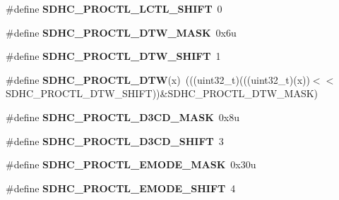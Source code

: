 \begin{DoxyCompactItemize}
\item 
\#define {\bfseries S\+D\+H\+C\+\_\+\+P\+R\+O\+C\+T\+L\+\_\+\+L\+C\+T\+L\+\_\+\+S\+H\+I\+FT}~0\hypertarget{group__SDHC__Register__Masks_ga754a95dd49bc69dbc62ae443f1c12d16}{}\label{group__SDHC__Register__Masks_ga754a95dd49bc69dbc62ae443f1c12d16}

\item 
\#define {\bfseries S\+D\+H\+C\+\_\+\+P\+R\+O\+C\+T\+L\+\_\+\+D\+T\+W\+\_\+\+M\+A\+SK}~0x6u\hypertarget{group__SDHC__Register__Masks_gabd8aa52532f5ddcfe86bbd56dd467aaa}{}\label{group__SDHC__Register__Masks_gabd8aa52532f5ddcfe86bbd56dd467aaa}

\item 
\#define {\bfseries S\+D\+H\+C\+\_\+\+P\+R\+O\+C\+T\+L\+\_\+\+D\+T\+W\+\_\+\+S\+H\+I\+FT}~1\hypertarget{group__SDHC__Register__Masks_ga7738f58de3f0c8a3c55fdf494fa9b7a5}{}\label{group__SDHC__Register__Masks_ga7738f58de3f0c8a3c55fdf494fa9b7a5}

\item 
\#define {\bfseries S\+D\+H\+C\+\_\+\+P\+R\+O\+C\+T\+L\+\_\+\+D\+TW}(x)~(((uint32\+\_\+t)(((uint32\+\_\+t)(x))$<$$<$S\+D\+H\+C\+\_\+\+P\+R\+O\+C\+T\+L\+\_\+\+D\+T\+W\+\_\+\+S\+H\+I\+FT))\&S\+D\+H\+C\+\_\+\+P\+R\+O\+C\+T\+L\+\_\+\+D\+T\+W\+\_\+\+M\+A\+SK)\hypertarget{group__SDHC__Register__Masks_gae2aac9ca891c75cdd5355a7cc7b012e8}{}\label{group__SDHC__Register__Masks_gae2aac9ca891c75cdd5355a7cc7b012e8}

\item 
\#define {\bfseries S\+D\+H\+C\+\_\+\+P\+R\+O\+C\+T\+L\+\_\+\+D3\+C\+D\+\_\+\+M\+A\+SK}~0x8u\hypertarget{group__SDHC__Register__Masks_ga597b9ab57f2ad515508d8b2e8b3832c7}{}\label{group__SDHC__Register__Masks_ga597b9ab57f2ad515508d8b2e8b3832c7}

\item 
\#define {\bfseries S\+D\+H\+C\+\_\+\+P\+R\+O\+C\+T\+L\+\_\+\+D3\+C\+D\+\_\+\+S\+H\+I\+FT}~3\hypertarget{group__SDHC__Register__Masks_ga9bd9fc5a38a643e4a04f03026a18e55a}{}\label{group__SDHC__Register__Masks_ga9bd9fc5a38a643e4a04f03026a18e55a}

\item 
\#define {\bfseries S\+D\+H\+C\+\_\+\+P\+R\+O\+C\+T\+L\+\_\+\+E\+M\+O\+D\+E\+\_\+\+M\+A\+SK}~0x30u\hypertarget{group__SDHC__Register__Masks_ga18ccde546ac8eb940360a8ff3671723b}{}\label{group__SDHC__Register__Masks_ga18ccde546ac8eb940360a8ff3671723b}

\item 
\#define {\bfseries S\+D\+H\+C\+\_\+\+P\+R\+O\+C\+T\+L\+\_\+\+E\+M\+O\+D\+E\+\_\+\+S\+H\+I\+FT}~4\hypertarget{group__SDHC__Register__Masks_gaf41ed2806a975210d570ee34cfe81630}{}\label{group__SDHC__Register__Masks_gaf41ed2806a975210d570ee34cfe81630}


\end{DoxyCompactItemize}

